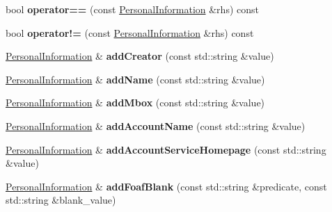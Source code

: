 \begin{DoxyCompactItemize}
bool {\bfseries operator==} (const \hyperlink{classomexmeta_1_1PersonalInformation}{Personal\+Information} \&rhs) const
\item 
\mbox{\label{classomexmeta_1_1PersonalInformation_abb71bc363efd7466c71733709aa50394}} 
bool {\bfseries operator!=} (const \hyperlink{classomexmeta_1_1PersonalInformation}{Personal\+Information} \&rhs) const
\item 
\mbox{\label{classomexmeta_1_1PersonalInformation_af37c1c7065dd9edbb89e90e8b37f35e8}} 
\hyperlink{classomexmeta_1_1PersonalInformation}{Personal\+Information} \& {\bfseries add\+Creator} (const std\+::string \&value)
\item 
\mbox{\label{classomexmeta_1_1PersonalInformation_a14d941856c6a188a964fb4a0c5475885}} 
\hyperlink{classomexmeta_1_1PersonalInformation}{Personal\+Information} \& {\bfseries add\+Name} (const std\+::string \&value)
\item 
\mbox{\label{classomexmeta_1_1PersonalInformation_aab4c7522fba200d4776d59c32085371d}} 
\hyperlink{classomexmeta_1_1PersonalInformation}{Personal\+Information} \& {\bfseries add\+Mbox} (const std\+::string \&value)
\item 
\mbox{\label{classomexmeta_1_1PersonalInformation_a9fd33e3189e1f77725e54dd24cc9dcb7}} 
\hyperlink{classomexmeta_1_1PersonalInformation}{Personal\+Information} \& {\bfseries add\+Account\+Name} (const std\+::string \&value)
\item 
\mbox{\label{classomexmeta_1_1PersonalInformation_a344fc47bde65f8c0ea75409160fdfe00}} 
\hyperlink{classomexmeta_1_1PersonalInformation}{Personal\+Information} \& {\bfseries add\+Account\+Service\+Homepage} (const std\+::string \&value)
\item 
\mbox{\label{classomexmeta_1_1PersonalInformation_af26bf72dc840b9c45fa7494f7164c04d}} 
\hyperlink{classomexmeta_1_1PersonalInformation}{Personal\+Information} \& {\bfseries add\+Foaf\+Blank} (const std\+::string \&predicate, const std\+::string \&blank\+\_\+value)

\end{DoxyCompactItemize}
